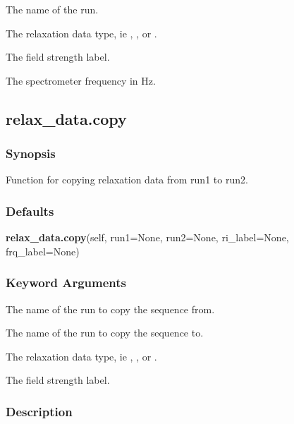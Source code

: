    The name of the run.   

   The relaxation data type, ie , , or .   

   The field strength label.   

   The spectrometer frequency in Hz.  

  

  

 \newpage 

 \subsection{relax\_data.copy} 

  
 \subsubsection{Synopsis} 

 Function for copying relaxation data from run1 to run2. 
  

  
 \subsubsection{Defaults} 

 \textsf{\textbf{relax\_data.copy}(self, run1=None, run2=None, ri\_label=None, frq\_label=None)} 

  
 \subsubsection{Keyword Arguments} 

   The name of the run to copy the sequence from.   

   The name of the run to copy the sequence to.   

   The relaxation data type, ie , , or .   

   The field strength label.  

  

  
 \subsubsection{Description} 

